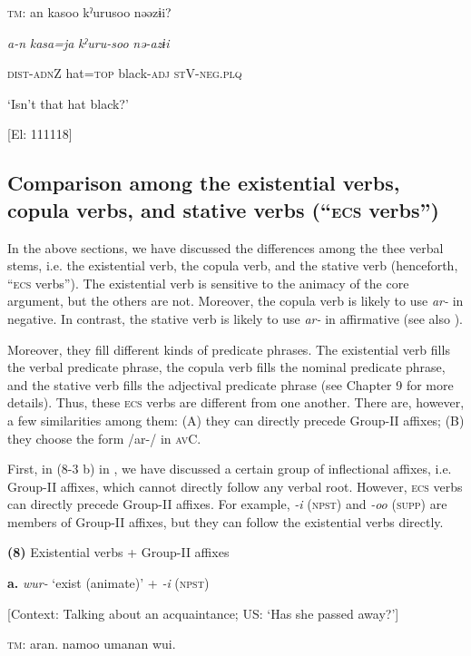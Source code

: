     \textsc{tm}:  an  kasoo  kˀurusoo  nəəzɨi?

      \textit{a-n}  \textit{kasa=ja}  \textit{kˀuru-soo}  \textit{nə-azɨi}

      \textsc{dist}-\textsc{adn}Z  hat=\textsc{top}  black-\textsc{adj}  \textsc{st}V-\textsc{neg}.\textsc{plq}

      ‘Isn’t that hat black?’

      [El: 111118]

\subsection{Comparison among the existential verbs, copula verbs, and stative verbs (“\textsc{ecs} verbs”)}

In the above sections, we have discussed the differences among the thee verbal stems, i.e. the existential verb, the copula verb, and the stative verb (henceforth, “\textsc{ecs} verbs”). The existential verb is sensitive to the animacy of the core argument, but the others are not. Moreover, the copula verb is likely to use \textit{ar-} in negative. In contrast, the stative verb is likely to use \textit{ar-} in affirmative (see also ).

Moreover, they fill different kinds of predicate phrases. The existential verb fills the verbal predicate phrase, the copula verb fills the nominal predicate phrase, and the stative verb fills the adjectival predicate phrase (see Chapter 9 for more details). Thus, these \textsc{ecs} verbs are different from one another. There are, however, a few similarities among them: (A) they can directly precede Group-II affixes; (B) they choose the form /ar-/ in \textsc{av}C.

  First, in (8-3 b) in , we have discussed a certain group of inflectional affixes, i.e. Group-II affixes, which cannot directly follow any verbal root. However, \textsc{ecs} verbs can directly precede Group-II affixes. For example, \textit{{}-i} (\textsc{npst}) and \textit{{}-oo} (\textsc{supp}) are members of Group-II affixes, but they can follow the existential verbs directly.

\textbf{(8)}  Existential verbs + Group-II affixes

  \textbf{a.}  \textit{wur-} ‘exist (animate)’ + \textit{-i} (\textsc{npst})

    [Context: Talking about an acquaintance; US: ‘Has she passed away?’]

    \textsc{tm}:  aran.  namoo  umanan  wui.

